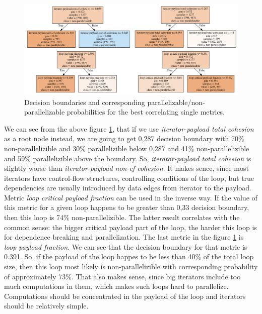 \begin{figure}[H]
\centering
\includegraphics[width=\linewidth]{figs/decision-trees-single-metrics.png}
\caption{Decision boundaries and corresponding parallelizable/non-parallelizable probabilities for the best correlating single metrics.}
\label{decision-trees-single-metrics}
\end{figure}
\qquad We can see from the above figure \ref{decision-trees-single-metrics}, that if we use \textit{iterator-payload total cohesion} as a root node instead, we are going to get 0,287 decision boundary with 70\% non-parallelizible and 30\% parallelizible below 0,287 and 41\% non-parallelizible and 59\% parallelizible above the boundary. So, \textit{iterator-payload total cohesion} is slightly worse than \textit{iterator-payload non-cf cohesion}. It makes sence, since most iterators have control-flow structures, controlling conditions of the loop, but true dependencies are usually introduced by data edges from iterator to the payload. Metric \textit{loop critical payload fraction} can be used in the inverse way. If the value of this metric for a given loop happens to be greater than 0,33 decision boundary, then this loop is 74\% non-parallelizible. The latter result correlates with the common sense: the bigger critical payload part of the loop, the harder this loop is for dependence breaking and parallelization. The last metric in the figure \ref{decision-trees-single-metrics} is \textit{loop payload fraction}. We can see that the decision boundary for that metric is 0.391. So, if the payload of the loop happes to be less than 40\% of the total loop size, then this loop most likely is non-parallelizible with corresponding probability of approximately 73\%. That also makes sense, since big iterators include too much computations in them, which makes such loops hard to parallelize. Computations should be concentrated in the payload of the loop and iterators should be relatively simple.\newline
